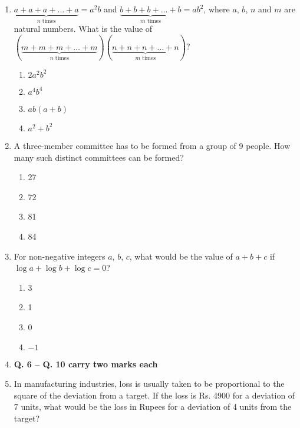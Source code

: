 \documentclass[journal]{IEEEtran}
\begin{document}
\begin{enumerate}
    \item {
    	\(\underbrace{a + a + a + \dots + a}_{n \text{ times}} = a^2 b\) and \(\underbrace{b + b + b + \dots + b}_{m \text{ times}} = a b^2\), where \(a\), \(b\), \(n\) and \(m\) are natural numbers. What is the value of \((\underbrace{m + m + m + \dots + m}_{n \text{ times}}) (\underbrace{n + n + n + \dots + n}_{m \text{ times}})\)?
    	\begin{multicols}{4}
	    	\begin{enumerate}
	    		\item \(2a^2b^2\)
	    		\item \(a^4b^4\) 
	    		\item\(ab(a+b)\) 
	    		\item \(a^2 + b^2\) 
	    	\end{enumerate}
    	\end{multicols}
    
    }    
    \item {A three-member committee has to be formed from a group of 9 people. How many such distinct committees can be formed?
    	\begin{multicols}{4}
	    	\begin{enumerate}
	    		\item 27
	    		\item 72
	    		\item 81
	    		\item 84
	    	\end{enumerate}
    	\end{multicols}}
    \item {For non-negative integers \(a\), \(b\), \(c\), what would be the value of \(a + b + c\) if \(\log a + \log b + \log c = 0\)?
    	\begin{multicols}{4}
    		\begin{enumerate}
    			\item 3
    			\item 1
    			\item 0
    			\item $-1$
    		\end{enumerate}
    	\end{multicols}
	}
	\item[]{\textbf{Q. 6 – Q. 10 carry two marks each}}
    \item {
    	In manufacturing industries, loss is usually taken to be proportional to the square of the deviation from a target. If the loss is Rs. 4900 for a deviation of 7 units, what would be the loss in Rupees for a deviation of 4 units from the target?
    	
}
\end{enumerate}
\end{document}
